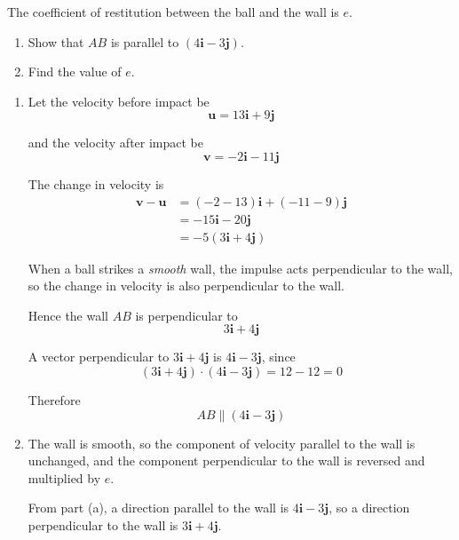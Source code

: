 \documentclass[leqno]{article}
\begin{document}
\begin{enumerate}[
  label=\textbf{\arabic*.},
  leftmargin=*,
  topsep=0pt,
  partopsep=0pt,
  parsep=0pt
]
The coefficient of restitution between the ball and the wall is $e$. \\

\begin{enumerate}[label=\textbf{(\alph*)}]
  \item Show that $AB$ is parallel to $(4\mathbf{i}-3\mathbf{j})$.  \\
  \item Find the value of $e$.  \\
\end{enumerate}

\vspace*{10pt}

\begin{djsSolution}
\begin{enumerate}[label=\textbf{(\alph*)}]
  \item Let the velocity before impact be
  \[
  \mathbf{u}=13\mathbf{i}+9\mathbf{j}
  \]

  and the velocity after impact be
  \[
  \mathbf{v}=-2\mathbf{i}-11\mathbf{j}
  \]

  The change in velocity is
  \begin{align*}
  \mathbf{v}-\mathbf{u}
  &=(-2-13)\mathbf{i}+(-11-9)\mathbf{j} \\
  &=-15\mathbf{i}-20\mathbf{j} \\
  &=-5(3\mathbf{i}+4\mathbf{j})
  \end{align*}

  When a ball strikes a \emph{smooth} wall, the impulse acts perpendicular to the wall, so the change in velocity is also perpendicular to the wall.

  Hence the wall $AB$ is perpendicular to
  \[
  3\mathbf{i}+4\mathbf{j}
  \]

  A vector perpendicular to $3\mathbf{i}+4\mathbf{j}$ is $4\mathbf{i}-3\mathbf{j}$, since
  \[
  (3\mathbf{i}+4\mathbf{j})\cdot(4\mathbf{i}-3\mathbf{j})=12-12=0
  \]

  Therefore
  \[
  AB \parallel (4\mathbf{i}-3\mathbf{j})
  \]

  \item The wall is smooth, so the component of velocity parallel to the wall is unchanged, and the component perpendicular to the wall is reversed and multiplied by $e$.

  From part (a), a direction parallel to the wall is $4\mathbf{i}-3\mathbf{j}$, so a direction perpendicular to the wall is $3\mathbf{i}+4\mathbf{j}$.


\end{enumerate}
\end{djsSolution}
\end{enumerate}
\end{document}
